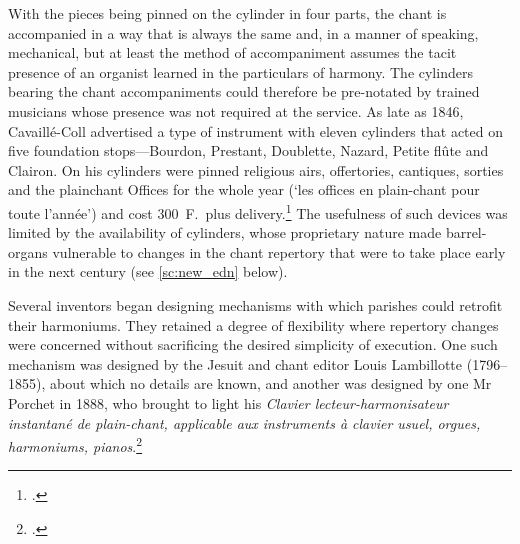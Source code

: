   {\cite[198]{LaFageOrgueCabias1834}}
{With the pieces being pinned on the \linebreak{}cylinder in four parts, the chant is accompanied in a way that is always the same and, in a manner of speaking, mechanical, but at least the method of accompaniment assumes the tacit presence of an organist learned in the particulars of harmony.}
\noindent
The cylinders bearing the chant accompaniments could therefore be pre-notated by trained musicians whose presence was not required at the service.
As late as 1846, Cavaillé-Coll advertised a type of instrument with eleven cylinders that acted on five foundation stops---Bourdon, Prestant, Doublette, Nazard, Petite flûte and Clairon.
On his cylinders were pinned religious airs, offertories, cantiques, sorties and the plainchant Offices for the whole year (`les offices en plain-chant pour toute l'année') and cost 300~F.\ plus delivery.\footcite[626]{DouglassCavailleCollmusiciansdocumented1980}
The usefulness of such devices was limited by the availability of cylinders, whose proprietary nature made barrel-organs vulnerable to changes in the chant repertory that were to take place early in the next century (see \cref{sc:new_edn} below).

Several inventors began designing mechanisms with which parishes could retrofit their harmoniums.
They retained a degree of flexibility where repertory changes were concerned without sacrificing the desired simplicity of execution.
One such mechanism was designed by the Jesuit and chant editor Louis Lambillotte (1796--1855), about which no details are known, and another was designed by one Mr Porchet in 1888, who brought to light his \textit{Clavier lecteur-harmonisateur instantané de plain-chant, applicable aux instruments à clavier usuel, orgues, harmoniums, pianos}.\footcites[5]{NisardNoticevietravaux1863}[100]{Bulletinofficielpropriete1888}

